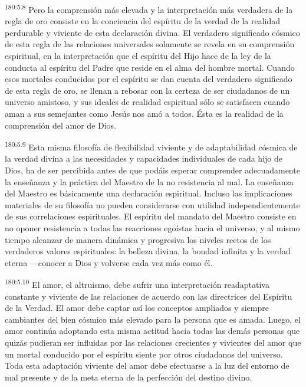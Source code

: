 \par
\textsuperscript{180:5.8} Pero la comprensión más elevada y la interpretación más verdadera de la regla de oro consiste en la conciencia del espíritu de la verdad de la realidad perdurable y viviente de esta declaración divina. El verdadero significado cósmico de esta regla de las relaciones universales solamente se revela en su comprensión espiritual, en la interpretación que el espíritu del Hijo hace de la ley de la conducta al espíritu del Padre que reside en el alma del hombre mortal. Cuando esos mortales conducidos por el espíritu se dan cuenta del verdadero significado de esta regla de oro, se llenan a rebosar con la certeza de ser ciudadanos de un universo amistoso, y sus ideales de realidad espiritual sólo se satisfacen cuando aman a sus semejantes como Jesús nos amó a todos. Ésta es la realidad de la comprensión del amor de Dios.

\par
\textsuperscript{180:5.9} Esta misma filosofía de flexibilidad viviente y de adaptabilidad cósmica de la verdad divina a las necesidades y capacidades individuales de cada hijo de Dios, ha de ser percibida antes de que podáis esperar comprender adecuadamente la enseñanza y la práctica del Maestro de la no resistencia al mal. La enseñanza del Maestro es básicamente una declaración espiritual. Incluso las implicaciones materiales de su filosofía no pueden considerarse con utilidad independientemente de sus correlaciones espirituales. El espíritu del mandato del Maestro consiste en no oponer resistencia a todas las reacciones egoístas hacia el universo, y al mismo tiempo alcanzar de manera dinámica y progresiva los niveles rectos de los verdaderos valores espirituales: la belleza divina, la bondad infinita y la verdad eterna ---conocer a Dios y volverse cada vez más como él.

\par
\textsuperscript{180:5.10} El amor, el altruismo, debe sufrir una interpretación readaptativa constante y viviente de las relaciones de acuerdo con las directrices del Espíritu de la Verdad. El amor debe captar así los conceptos ampliados y siempre cambiantes del bien cósmico más elevado para la persona que es amada. Luego, el amor continúa adoptando esta misma actitud hacia todas las demás personas que quizás pudieran ser influidas por las relaciones crecientes y vivientes del amor que un mortal conducido por el espíritu siente por otros ciudadanos del universo. Toda esta adaptación viviente del amor debe efectuarse a la luz del entorno de mal presente y de la meta eterna de la perfección del destino divino.

